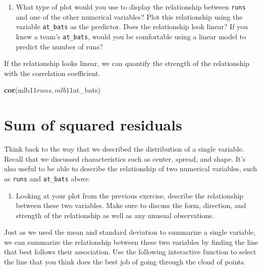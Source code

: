\documentclass[]{book}
\newenvironment{Shaded}{\begin{snugshade}}{\end{snugshade}}
\newcommand{\KeywordTok}[1]{\textcolor[rgb]{0.13,0.29,0.53}{\textbf{{#1}}}}
\newcommand{\NormalTok}[1]{{#1}}
\providecommand{\tightlist}{%
  \setlength{\itemsep}{0pt}\setlength{\parskip}{0pt}}
\theoremstyle{definition}
\theoremstyle{definition}
\theoremstyle{remark}
\begin{document}
\begin{enumerate}
\def\labelenumi{\arabic{enumi}.}
\tightlist
\item
  What type of plot would you use to display the relationship between
  \texttt{runs} and one of the other numerical variables? Plot this
  relationship using the variable \texttt{at\_bats} as the predictor.
  Does the relationship look linear? If you knew a team's
  \texttt{at\_bats}, would you be comfortable using a linear model to
  predict the number of runs?
\end{enumerate}

If the relationship looks linear, we can quantify the strength of the
relationship with the correlation coefficient.

\begin{Shaded}
\begin{Highlighting}[]
\KeywordTok{cor}\NormalTok{(mlb11$runs, mlb11$at_bats)}
\end{Highlighting}
\end{Shaded}

\section*{Sum of squared residuals}\label{sum-of-squared-residuals}

Think back to the way that we described the distribution of a single
variable. Recall that we discussed characteristics such as center,
spread, and shape. It's also useful to be able to describe the
relationship of two numerical variables, such as \texttt{runs} and
\texttt{at\_bats} above.

\begin{enumerate}
\def\labelenumi{\arabic{enumi}.}
\setcounter{enumi}{1}
\tightlist
\item
  Looking at your plot from the previous exercise, describe the
  relationship between these two variables. Make sure to discuss the
  form, direction, and strength of the relationship as well as any
  unusual observations.
\end{enumerate}

Just as we used the mean and standard deviation to summarize a single
variable, we can summarize the relationship between these two variables
by finding the line that best follows their association. Use the
following interactive function to select the line that you think does
the best job of going through the cloud of points.
\end{document}
